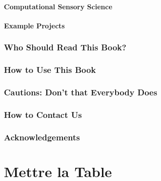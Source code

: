 \documentclass[
]{book}
\begin{document}
\hypertarget{computational-sensory-science}{%
\subsection*{Computational Sensory Science}\label{computational-sensory-science}}

\hypertarget{example-projects}{%
\subsection*{Example Projects}\label{example-projects}}

\hypertarget{who-should-read-this-book}{%
\section*{Who Should Read This Book?}\label{who-should-read-this-book}}

\hypertarget{how-to-use-this-book}{%
\section*{How to Use This Book}\label{how-to-use-this-book}}

\hypertarget{cautions-dont-that-everybody-does}{%
\section*{Cautions: Don't that Everybody Does}\label{cautions-dont-that-everybody-does}}

\hypertarget{how-to-contact-us}{%
\section*{How to Contact Us}\label{how-to-contact-us}}

\hypertarget{acknowledgements}{%
\section*{Acknowledgements}\label{acknowledgements}}

\hypertarget{part-mettre-la-table}{%
\part*{Mettre la Table}\label{part-mettre-la-table}}
\end{document}

